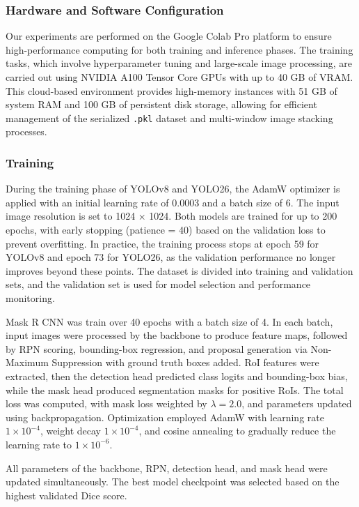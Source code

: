 \documentclass[conference]{IEEEtran}
\begin{document}
\subsubsection{ Hardware and Software Configuration}
Our experiments are performed on the Google Colab Pro platform to ensure high-performance computing for both training and inference phases. The training tasks, which involve hyperparameter tuning and large-scale image processing, are carried out using NVIDIA A100 Tensor Core GPUs with up to 40 GB of VRAM. This cloud-based environment provides high-memory instances with 51 GB of system RAM and 100 GB of persistent disk storage, allowing for efficient management of the serialized \texttt{.pkl} dataset and multi-window image stacking processes.
\subsubsection{Training}

During the training phase of YOLOv8 and YOLO26, the AdamW optimizer is applied with an initial learning rate of 0.0003 and a batch size of 6. The input image resolution is set to 1024 × 1024. Both models are trained for up to 200 epochs, with early stopping (patience = 40) based on the validation loss to prevent overfitting. In practice, the training process stops at epoch 59 for YOLOv8 and epoch 73 for YOLO26, as the validation performance no longer improves beyond these points. The dataset is divided into training and validation sets, and the validation set is used for model selection and performance monitoring.


Mask R CNN was train over 40 epochs with a batch size of 4. In each batch, input images were processed by the backbone to produce feature maps, followed by RPN scoring, bounding-box regression, and proposal generation via Non-Maximum Suppression with ground truth boxes added. RoI features were extracted, then the detection head predicted class logits and bounding-box bias, while the mask head produced segmentation masks for positive RoIs. The total loss was computed, with mask loss weighted   by $\lambda = 2.0$, and parameters updated using backpropagation. Optimization employed AdamW with learning rate $1\times10^{-4}$, weight decay $1\times10^{-4}$, and cosine annealing to gradually reduce the learning rate to $1\times10^{-6}$.  

All parameters of the backbone, RPN, detection head, and mask head were updated simultaneously. The best model checkpoint was selected based on the highest validated Dice score.
\end{document}
